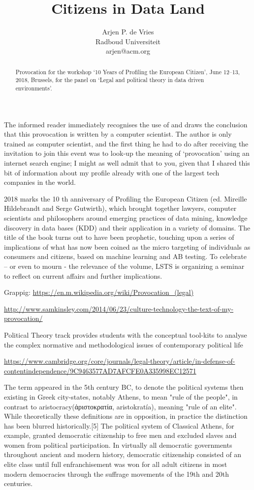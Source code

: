 \documentclass[a4paper,twoside,12pt]{article}
\title{Citizens in Data Land}
\author{Arjen P. de Vries\\Radboud Universiteit\\arjen@acm.org}
\date{}
\begin{document}
\maketitle

\begin{abstract}
Provocation for the workshop `10 Years of Profiling the European Citizen', June 12--13, 2018, Brussels, for the panel on `Legal and political theory in data driven environments'.
\end{abstract}

The informed reader immediately recognises the use of \Latex and draws the conclusion that this provocation is written by a computer scientist. The author is only trained as computer scientist, and the first thing he had to do after receiving the invitation to join this event was to look-up the meaning of `provocation' using an internet search engine; I might as well admit that to you, given that I shared this bit of information about my profile already with one of the largest tech companies in the world.



2018 marks the 10 th anniversary of Profiling the European Citizen (ed. Mireille Hildebrandt and Serge
Gutwirth), which brought together lawyers, computer scientists and philosophers around emerging
practices of data mining, knowledge discovery in data bases (KDD) and their application in a variety
of domains.
The title of the book turns out to have been prophetic, touching upon a series of implications of what
has now been coined as the micro targeting of individuals as consumers and citizens, based on
machine learning and AB testing.
To celebrate – or even to mourn - the relevance of the volume, LSTS is organizing a seminar to reflect
on current affairs and further implications.



Grappig:
\url{https://en.m.wikipedia.org/wiki/Provocation_(legal)}


\url{http://www.samkinsley.com/2014/06/23/culture-technology-the-text-of-my-provocation/}


Political Theory track provides students with the conceptual tool-kits to analyse the complex normative and methodological issues of contemporary political life

\url{https://www.cambridge.org/core/journals/legal-theory/article/in-defense-of-contentindependence/9C9463577AD7AFCFE0A335998EC12571}

The term appeared in the 5th century BC, to denote the political systems then existing in Greek city-states, notably Athens, to mean "rule of the people", in contrast to aristocracy(ἀριστοκρατία, aristokratía), meaning "rule of an elite". While theoretically these definitions are in opposition, in practice the distinction has been blurred historically.[5] The political system of Classical Athens, for example, granted democratic citizenship to free men and excluded slaves and women from political participation. In virtually all democratic governments throughout ancient and modern history, democratic citizenship consisted of an elite class until full enfranchisement was won for all adult citizens in most modern democracies through the suffrage movements of the 19th and 20th centuries.
\end{document}
